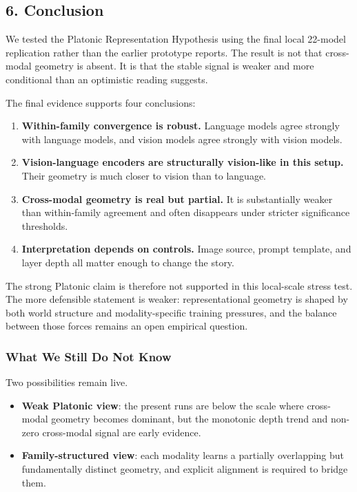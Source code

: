 \documentclass[
]{article}
\providecommand{\tightlist}{%
  \setlength{\itemsep}{0pt}\setlength{\parskip}{0pt}}
\begin{document}
\subsection{6. Conclusion}\label{conclusion}

We tested the Platonic Representation Hypothesis using the final local
22-model replication rather than the earlier prototype reports. The
result is not that cross-modal geometry is absent. It is that the stable
signal is weaker and more conditional than an optimistic reading
suggests.

The final evidence supports four conclusions:

\begin{enumerate}
\def\labelenumi{\arabic{enumi}.}
\tightlist
\item
  \textbf{Within-family convergence is robust.} Language models agree
  strongly with language models, and vision models agree strongly with
  vision models.
\item
  \textbf{Vision-language encoders are structurally vision-like in this
  setup.} Their geometry is much closer to vision than to language.
\item
  \textbf{Cross-modal geometry is real but partial.} It is substantially
  weaker than within-family agreement and often disappears under
  stricter significance thresholds.
\item
  \textbf{Interpretation depends on controls.} Image source, prompt
  template, and layer depth all matter enough to change the story.
\end{enumerate}

The strong Platonic claim is therefore not supported in this local-scale
stress test. The more defensible statement is weaker:
representational geometry is shaped by both world structure and
modality-specific training pressures, and the balance between those
forces remains an open empirical question.

\subsubsection{What We Still Do Not
Know}\label{what-we-still-do-not-know}

Two possibilities remain live.

\begin{itemize}
\tightlist
\item
  \textbf{Weak Platonic view}: the present runs are below the scale
  where cross-modal geometry becomes dominant, but the monotonic depth
  trend and non-zero cross-modal signal are early evidence.
\item
  \textbf{Family-structured view}: each modality learns a partially
  overlapping but fundamentally distinct geometry, and explicit
  alignment is required to bridge them.
\end{itemize}
\end{document}

